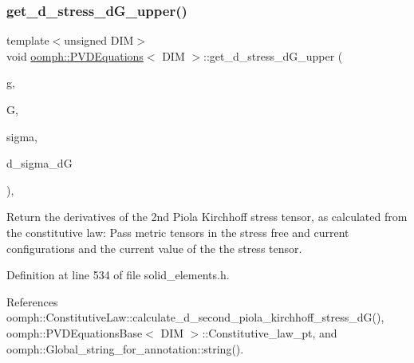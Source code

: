 \mbox{\label{classoomph_1_1PVDEquations_a522084ede6bf0e6b6154ec0ac61c3f5f}} 
\subsubsection{\texorpdfstring{get\+\_\+d\+\_\+stress\+\_\+d\+G\+\_\+upper()}{get\_d\_stress\_dG\_upper()}}
{\footnotesize\ttfamily template$<$unsigned D\+IM$>$ \\
void \hyperlink{classoomph_1_1PVDEquations}{oomph\+::\+P\+V\+D\+Equations}$<$ D\+IM $>$\+::get\+\_\+d\+\_\+stress\+\_\+d\+G\+\_\+upper (\begin{DoxyParamCaption}\item[{const \hyperlink{classoomph_1_1DenseMatrix}{Dense\+Matrix}$<$ double $>$ \&}]{g,  }\item[{const \hyperlink{classoomph_1_1DenseMatrix}{Dense\+Matrix}$<$ double $>$ \&}]{G,  }\item[{const \hyperlink{classoomph_1_1DenseMatrix}{Dense\+Matrix}$<$ double $>$ \&}]{sigma,  }\item[{\hyperlink{classoomph_1_1RankFourTensor}{Rank\+Four\+Tensor}$<$ double $>$ \&}]{d\+\_\+sigma\+\_\+dG }\end{DoxyParamCaption})\hspace{0.3cm}{\ttfamily [inline]}, {\ttfamily [protected]}}



Return the derivatives of the 2nd Piola Kirchhoff stress tensor, as calculated from the constitutive law\+: Pass metric tensors in the stress free and current configurations and the current value of the the stress tensor. 



Definition at line 534 of file solid\+\_\+elements.\+h.



References oomph\+::\+Constitutive\+Law\+::calculate\+\_\+d\+\_\+second\+\_\+piola\+\_\+kirchhoff\+\_\+stress\+\_\+d\+G(), oomph\+::\+P\+V\+D\+Equations\+Base$<$ D\+I\+M $>$\+::\+Constitutive\+\_\+law\+\_\+pt, and oomph\+::\+Global\+\_\+string\+\_\+for\+\_\+annotation\+::string().

\mbox{\label{classoomph_1_1PVDEquations_add6a194b0138b09834022b29bbc75eb6}} 
